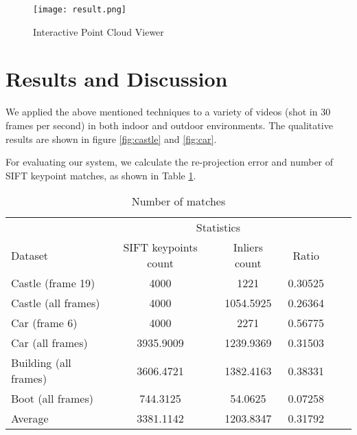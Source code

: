 \documentclass[11pt, a4paper, openany]{article}
\begin{document}
\begin{figure}[H]
  \texttt{[image: result.png]}
  \caption{Interactive Point Cloud Viewer}
  \label{fig:result}
\end{figure}


\section{Results and Discussion}
We applied the above mentioned techniques to a variety of videos (shot in 30 frames per second) in both indoor and outdoor environments. The qualitative results are shown in figure \ref{fig:castle} and \ref{fig:car}.

For evaluating our system, we calculate the re-projection error and number of SIFT keypoint matches, as shown in Table \ref{tab:matches}.

\begin{table}[H] %
\centering %
\begin{tabular}{l c c c c c} %
\toprule %
& \multicolumn{3}{c}{Statistics} \\ %
\cmidrule(l){2-4} %
Dataset & SIFT keypoints count & Inliers count & Ratio\\ %
\midrule %
Castle (frame 19) & 4000 & 1221 & 0.30525\\ %
Castle (all frames) & 4000 & 1054.5925 & 0.26364\\ %
Car (frame 6) & 4000 & 2271 & 0.56775\\ %
Car (all frames) & 3935.9009 & 1239.9369 & 0.31503\\ %
Building (all frames) & 3606.4721 & 1382.4163 & 0.38331\\ %
Boot (all frames) & 744.3125 & 54.0625 & 0.07258\\ %
\midrule %
\midrule %
Average & 3381.1142 & 1203.8347 & 0.31792\\ %
\bottomrule %
\end{tabular}
\caption{Number of matches} %
\label{tab:matches} %
\end{table}
\end{document}
